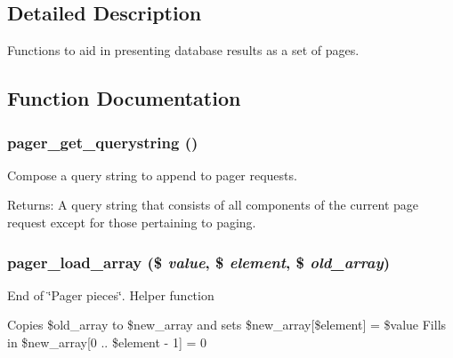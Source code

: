 \subsection{Detailed Description}
Functions to aid in presenting database results as a set of pages. 

\subsection{Function Documentation}
\hypertarget{pager_8inc_45070c26384d1b35761df2299e223d24}{
\subsubsection[{pager\_\-get\_\-querystring}]{\setlength{\rightskip}{0pt plus 5cm}pager\_\-get\_\-querystring ()}}
\label{pager_8inc_45070c26384d1b35761df2299e223d24}


Compose a query string to append to pager requests.

\begin{Desc}
\item[Returns:]A query string that consists of all components of the current page request except for those pertaining to paging. \end{Desc}
\hypertarget{pager_8inc_0f82d7cb1702f6d160285903378a9919}{
\subsubsection[{pager\_\-load\_\-array}]{\setlength{\rightskip}{0pt plus 5cm}pager\_\-load\_\-array (\$ {\em value}, \/  \$ {\em element}, \/  \$ {\em old\_\-array})}}
\label{pager_8inc_0f82d7cb1702f6d160285903378a9919}


End of \char`\"{}Pager pieces\char`\"{}. Helper function

Copies \$old\_\-array to \$new\_\-array and sets \$new\_\-array\mbox{[}\$element\mbox{]} = \$value Fills in \$new\_\-array\mbox{[}0 .. \$element - 1\mbox{]} = 0 